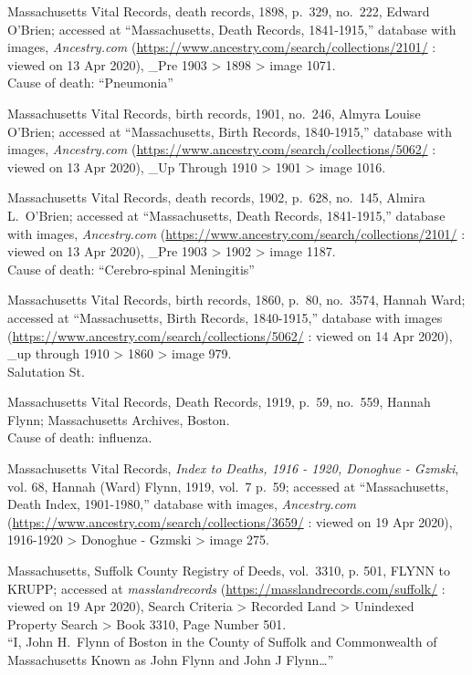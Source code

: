 \begin{thebibliography}{999}
	Massachusetts Vital Records, death records, 1898, p.\ 329, no.\ 222, Edward O'Brien; accessed at ``Massachusetts, Death Records, 1841-1915,'' database with images, \textit{Ancestry.com} (\url{https://www.ancestry.com/search/collections/2101/} : viewed on 13 Apr 2020), \_Pre 1903 > 1898 > image 1071.\\
	Cause of death: ``Pneumonia''
	
	Massachusetts Vital Records, birth records, 1901, no.\ 246, Almyra Louise O'Brien; accessed at ``Massachusetts, Birth Records, 1840-1915,'' database with images, \textit{Ancestry.com} (\url{https://www.ancestry.com/search/collections/5062/} : viewed on 13 Apr 2020), \_Up Through 1910 > 1901 > image 1016.
	
	Massachusetts Vital Records, death records, 1902, p.\ 628, no.\ 145, Almira L.\ O'Brien; accessed at ``Massachusetts, Death Records, 1841-1915,'' database with images, \textit{Ancestry.com} (\url{https://www.ancestry.com/search/collections/2101/} : viewed on 13 Apr 2020), \_Pre 1903 > 1902 > image 1187.\\
	Cause of death: ``Cerebro-spinal Meningitis''
	
	Massachusetts Vital Records, birth records, 1860, p.\ 80, no.\ 3574, Hannah Ward; accessed at ``Massachusetts, Birth Records, 1840-1915,'' database with images (\url{https://www.ancestry.com/search/collections/5062/} : viewed on 14 Apr 2020), \_up through 1910 > 1860 > image 979.\\
	Salutation St.
	
	Massachusetts Vital Records, Death Records, 1919, p.\ 59, no.\ 559, Hannah Flynn; Massachusetts Archives, Boston.\\
	Cause of death: influenza.
	
	Massachusetts Vital Records, \textit{Index to Deaths, 1916 - 1920, Donoghue - Gzmski}, vol. 68, Hannah (Ward) Flynn, 1919, vol.\ 7 p.\ 59; accessed at ``Massachusetts, Death Index, 1901-1980,'' database with images, \textit{Ancestry.com} (\url{https://www.ancestry.com/search/collections/3659/} : viewed on 19 Apr 2020), 1916-1920 > Donoghue - Gzmski > image 275.
	
	Massachusetts, Suffolk County Registry of Deeds, vol.\ 3310, p. 501, FLYNN to KRUPP; accessed at \textit{masslandrecords} (\url{https://masslandrecords.com/suffolk/} : viewed on 19 Apr 2020), Search Criteria >  Recorded Land > Unindexed Property Search > Book 3310, Page Number 501.\\
	``I, John H.\ Flynn of Boston in the County of Suffolk and Commonwealth of Massachusetts Known as John Flynn and John J Flynn\ldots''
	

\end{thebibliography}
